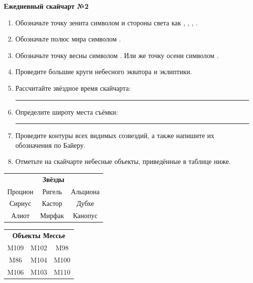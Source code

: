 \documentclass{./SAS-class-skygen}
\begin{document}
    
    
    
	\begin{center}
		\large\textbf{Ежедневный скайчарт №2}
	\end{center}

	\begin{enumerate}
		\item Обозначьте точку зенита символом  и стороны света как , , , .
		\item Обозначьте полюс мира символом .
		\item Обозначьте точку весны символом \Aries. Или же точку осени символом \Libra.
		\item Проведите большие круги небесного экватора и эклиптики.
		\item Рассчитайте звёздное время скайчарта: \rule{2cm}{0.4pt}
		\item Определите широту места съёмки: \rule{2cm}{0.4pt}
		\item Проведите контуры всех видимых созвездий, а также напишите их обозначения по Байеру.
		\item Отметьте на скайчарте небесные объекты, приведённые в таблице ниже.
	\end{enumerate}
	
    \vspace{0.5cm}

    \begin{table}[h!]
    \centering
    \begin{tabular}{ccc}
    \multicolumn{3}{c}{\textbf{Звёзды}} \\ Процион & Ригель & Альциона \\
Сириус & Кастор & Дубхе \\
Алиот & Мирфак & Канопус \\

\end{tabular}
    \hfill
    \begin{tabular}{ccc}
    \multicolumn{3}{c}{\textbf{Объекты Мессье}} \\ M109 & M102 & M98 \\
M86 & M104 & M100 \\
M106 & M103 & M110 \\

\end{tabular}
    \end{table}
	
\end{document}
